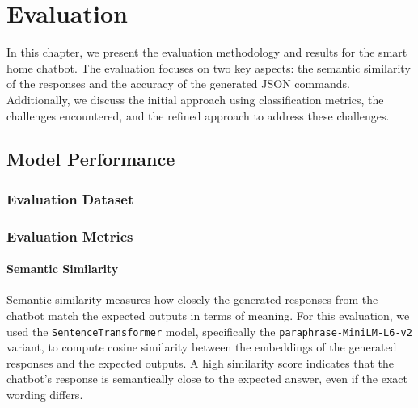 
\chapter{Evaluation}
\label{chap:evaluation}

In this chapter, we present the evaluation methodology and results for the smart home chatbot. The evaluation focuses on two key aspects: the semantic similarity of the responses and the accuracy of the generated JSON commands. Additionally, we discuss the initial approach using classification metrics, the challenges encountered, and the refined approach to address these challenges.

\section{Model Performance}
\label{sec:modelperform}
\subsection{Evaluation Dataset}

\subsection{Evaluation Metrics}

\subsubsection{Semantic Similarity}

Semantic similarity measures how closely the generated responses from the chatbot match the expected outputs in terms of meaning. For this evaluation, we used the \texttt{SentenceTransformer} model, specifically the \texttt{paraphrase-MiniLM-L6-v2} variant, to compute cosine similarity between the embeddings of the generated responses and the expected outputs. A high similarity score indicates that the chatbot's response is semantically close to the expected answer, even if the exact wording differs.

